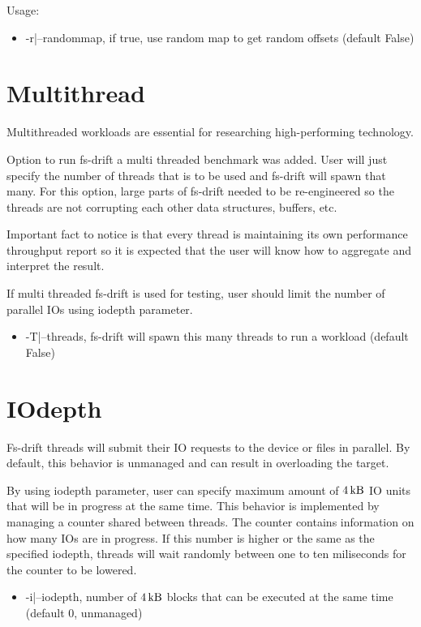\documentclass[
  color, %
  table, %
  lof,   %
  lot,   %
]{fithesis3}
\begin{document}
Usage:
\begin{itemize}
    \item -r|--randommap, if true, use random map to get random offsets (default False)
\end{itemize}
\clearpage
\section{Multithread}
Multithreaded workloads are essential for researching high-performing technology.

Option to run fs-drift a multi threaded benchmark was added. User will just specify the number of threads that is to be used and fs-drift will spawn that many. For this option, large parts of fs-drift needed to be re-engineered so the threads are not corrupting each other data structures, buffers, etc.

Important fact to notice is that every thread is maintaining its own performance throughput report so it is expected that the user will know how to aggregate and interpret the result.

If multi threaded fs-drift is used for testing, user should limit the number of parallel IOs using iodepth parameter.


\begin{itemize}
    \item -T|--threads, fs-drift will spawn this many threads to run a workload (default False)
\end{itemize}

\section{IOdepth}
Fs-drift threads will submit their IO requests to the device or files in parallel. By default, this behavior is unmanaged and can result in overloading the target.

By using iodepth parameter, user can specify maximum amount of $\SI{4}{\kilo\byte}$ IO units that will be in progress at the same time. This behavior is implemented by managing a counter shared between threads. The counter contains information on how many IOs are in progress. If this number is higher or the same as the specified iodepth, threads will wait randomly between one to ten miliseconds for the counter to be lowered. 

\begin{itemize}
    \item -i|--iodepth, number of $\SI{4}{\kilo\byte}$ blocks that can be executed at the same time (default 0, unmanaged)
\end{itemize}
\end{document}
